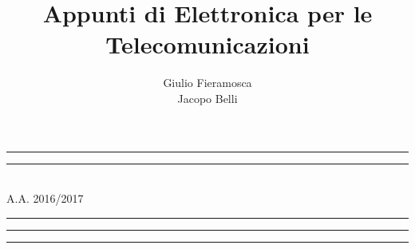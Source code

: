 \documentclass[12pt,a4paper]{book}
\title{Appunti di Elettronica per le Telecomunicazioni}
\author{
	Giulio Fieramosca\\Jacopo Belli}
\begin{document}
  \setlength{\parindent}{0cm}
  \setlength{\parskip}{0.5em}
  
  \frontmatter
  
  
  \begin{titlepage}
  	\begingroup %
  	\newlength{\drop} %
  	\textheight %
  	
  	\rule{\textwidth}{1pt}\par %
  	\vspace{2pt}\vspace{-\baselineskip} %
  	\rule{\textwidth}{0.4pt}\par %
  	
  	\vspace{\drop} %
  	\centering %
  	{\Huge\makeatletter\@title\makeatother}\\[0.5\baselineskip] %
  	{\Large A.A. 2016/2017}%
  	
  	\vspace{\drop} %
  	\rule{0.3\textwidth}{0.4pt}\par %
  	\vspace{\drop} %
  	
  	{\Large \makeatletter\@author\makeatother} %
  	
  	\vfill %
  	
  	
  	\vfill
  	
  	\rule{\textwidth}{0.4pt}\par %
  	\vspace{2pt}\vspace{-\baselineskip} %
  	\rule{\textwidth}{1pt}\par %
  	
  	\endgroup
  	\clearpage
  \end{titlepage}
  
\end{document}
